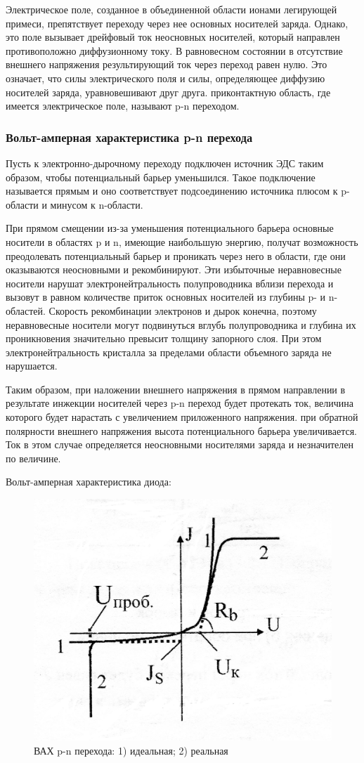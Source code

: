 Электрическое поле, созданное в объединенной области ионами легирующей примеси, препятствует переходу через нее основных носителей заряда. Однако, это поле вызывает дрейфовый ток неосновных носителей, который направлен противоположно диффузионному току. В равновесном состоянии в отсутствие внешнего напряжения результирующий ток через переход равен нулю. Это означает, что силы электрического поля и силы, определяющее диффузию носителей заряда, уравновешивают друг друга. приконтактную область, где имеется электрическое поле, называют p-n переходом.

\subsubsection{Вольт-амперная характеристика p-n перехода}
Пусть к электронно-дырочному переходу подключен источник ЭДС таким образом, чтобы потенциальный барьер уменьшился. Такое подключение называется прямым и оно соответствует подсоединению источника плюсом к p-области и минусом к n-области. 

При прямом смещении из-за уменьшения потенциального барьера основные носители в областях p и n, имеющие наибольшую энергию, получат возможность преодолевать потенциальный барьер и проникать через него в области, где они оказываются неосновными и рекомбинируют. Эти избыточные неравновесные носители нарушат электронейтральность полупроводника вблизи перехода и вызовут в равном количестве приток основных носителей из глубины p- и n-областей. Скорость рекомбинации электронов и дырок конечна, поэтому неравновесные носители могут подвинуться вглубь полупроводника и глубина их проникновения значительно превысит толщину запорного слоя. При этом электронейтральность кристалла за пределами области объемного заряда не нарушается. 

Таким образом, при наложении внешнего напряжения в прямом направлении в результате инжекции  носителей через p-n переход будет протекать ток, величина которого будет нарастать с увеличением приложенного напряжения. при обратной полярности внешнего напряжения высота потенциального барьера увеличивается. Ток в этом случае определяется неосновными носителями заряда и незначителен по величине.

Вольт-амперная характеристика диода:
\begin{figure}[h!]
	\centering
	\includegraphics[width=0.4\linewidth]{imgs/fig2.jpg}
	\caption{ВАХ p-n перехода: 1) идеальная; 2) реальная}
	\label{fig:2}
\end{figure}

